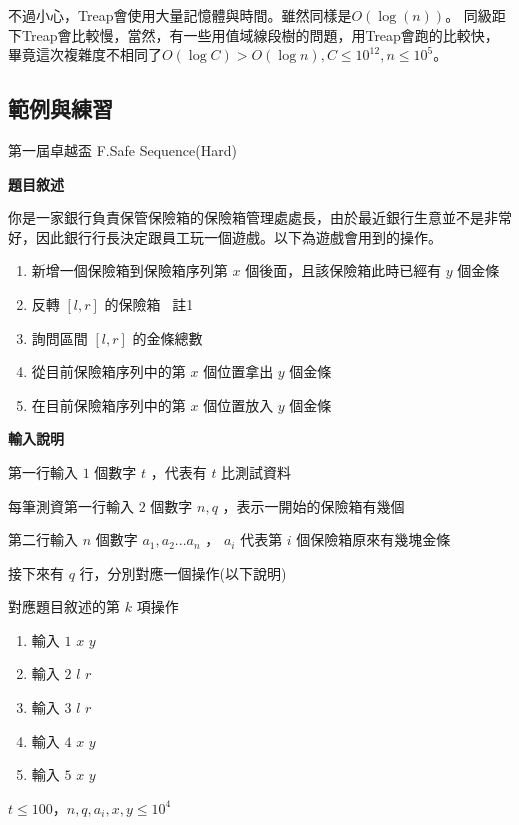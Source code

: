     不過小心，Treap會使用大量記憶體與時間。雖然同樣是$O(\log{(n)})$。
    同級距下Treap會比較慢，當然，有一些用值域線段樹的問題，用Treap會跑的比較快，
    畢竟這次複雜度不相同了$O(\log C) > O(\log n), C \le 10^{12}, n \le 10^5$。

    \subsection{範例與練習}

    \problem 第一屆卓越盃 F.Safe Sequence(Hard)

    \textbf{題目敘述}

    你是一家銀行負責保管保險箱的保險箱管理處處長，由於最近銀行生意並不是非常好，因此銀行行長決定跟員工玩一個遊戲。以下為遊戲會用到的操作。

    \begin{enumerate}
        \item 新增一個保險箱到保險箱序列第 $x$ 個後面，且該保險箱此時已經有 $y$ 個金條 
        \item 反轉 $[l,r]$ 的保險箱 ~註1~ 
        \item 詢問區間 $[l,r]$ 的金條總數
        \item 從目前保險箱序列中的第 $x$ 個位置拿出 $y$ 個金條 
        \item 在目前保險箱序列中的第 $x$ 個位置放入 $y$ 個金條 
    \end{enumerate}

    \textbf{輸入說明}

    第一行輸入 $1$ 個數字 $t$ ，代表有 $t$ 比測試資料
    
    每筆測資第一行輸入 $2$ 個數字 $n,q$ ，表示一開始的保險箱有幾個
    
    第二行輸入 $n$ 個數字 $a_1,a_2...a_n$ ， $a_i$ 代表第 $i$ 個保險箱原來有幾塊金條
    
    接下來有 $q$ 行，分別對應一個操作(以下說明)

    對應題目敘述的第 $k$ 項操作

    \begin{enumerate}
        \item 輸入 $1$ $x$ $y$
        \item 輸入 $2$ $l$ $r$
        \item 輸入 $3$ $l$ $r$
        \item 輸入 $4$ $x$ $y$
        \item 輸入 $5$ $x$ $y$
    \end{enumerate}

    $t \le 100$，$n,q,a_i,x,y \leq 10^4$

